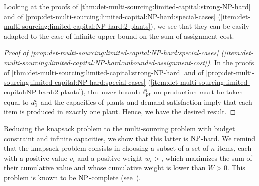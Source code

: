 Looking at the proofs of \cref{thm:det-multi-sourcing:limited-capital:strong-NP-hard} and of \cref{prop:det-multi-sourcing:limited-capital:NP-hard:special-cases} (\cref{item:det-multi-sourcing:limited-capital:NP-hard:2-plants}), we see that they can be easily adapted to the case of infinite upper bound on the sum of assignment cost.


\begin{proof}[Proof of \cref{prop:det-multi-sourcing:limited-capital:NP-hard:special-cases} (\cref{item:det-multi-sourcing:limited-capital:NP-hard:unbounded-assignment-cost})]
In the proofs of \cref{thm:det-multi-sourcing:limited-capital:strong-NP-hard} and of \cref{prop:det-multi-sourcing:limited-capital:NP-hard:special-cases} (\cref{item:det-multi-sourcing:limited-capital:NP-hard:2-plants}), the lower bounds $\ell_{pt}^i$ on production must be taken equal to $d_1^i$ and the capacities of plants and demand satisfaction imply that each item is produced in exactly one plant.
Hence, we have the desired result.
\end{proof}


Reducing the knapsack problem to the multi-sourcing problem with budget constraint and infinite capacities, we show that this latter is $\operatorname{NP}$-hard.
We remind that the knapsack problem consists in choosing a subset of a set of $n$ items, each with a positive value $v_i$ and a positive weight $w_i>$, which maximizes the sum of their cumulative value and whose cumulative weight is lower than $W>0$.
This problem is known to be $\operatorname{NP}$-complete (see~\citet{Garey1979}).



